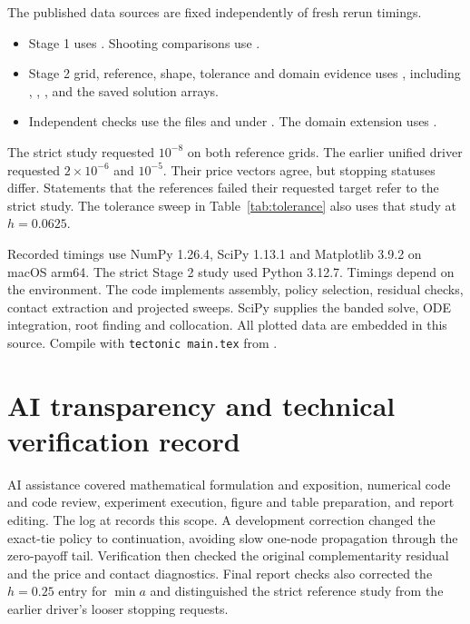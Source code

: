 \documentclass[11pt,a4paper]{article}
\numberwithin{equation}{section}
\begin{document}
The published data sources are fixed independently of fresh rerun timings.
\begin{itemize}\raggedright
\item Stage 1 uses . Shooting
      comparisons use .
\item Stage 2 grid, reference, shape, tolerance and domain evidence uses
      , including
      , ,
      , 
      and the saved solution arrays.
\item Independent checks use the files  and
       under .
      The domain extension uses .
\end{itemize}
The strict study requested $10^{-8}$ on both reference grids. The earlier
unified driver requested $2\times10^{-6}$ and $10^{-5}$. Their price
vectors agree, but stopping statuses differ. Statements that the references
failed their requested target refer to the strict study. The tolerance
sweep in Table~\ref{tab:tolerance} also uses that study at $h=0.0625$.

Recorded timings use NumPy 1.26.4, SciPy 1.13.1 and Matplotlib 3.9.2 on
macOS arm64. The strict Stage 2 study used Python 3.12.7. Timings depend
on the environment. The code implements assembly, policy selection,
residual checks, contact extraction and projected sweeps. SciPy supplies
the banded solve, ODE integration, root finding and collocation.
All plotted data are embedded in this source. Compile with
\texttt{tectonic main.tex} from .

\section{AI transparency and technical verification record}\label{sec:audit}
AI assistance covered mathematical formulation and exposition, numerical
code and code review, experiment execution, figure and table preparation,
and report editing. The log at 
records this scope. A development correction changed the exact-tie policy
to continuation, avoiding slow one-node propagation through the
zero-payoff tail. Verification then checked the original complementarity
residual and the price and contact diagnostics. Final report checks also
corrected the $h=0.25$ entry for $\min a$ and distinguished the strict
reference study from the earlier driver's looser stopping requests.
\end{document}
